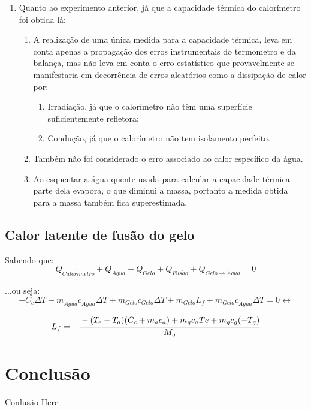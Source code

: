\documentclass[a4paper]{article}
\begin{document}
\begin{enumerate}
\begin{enumerate}
						\item
					\end{enumerate}
					\item Quanto ao experimento anterior, já que a capacidade térmica do calorímetro foi obtida lá:
					\begin{enumerate}
						\item A realização de uma única medida para a capacidade térmica, leva em conta apenas a propagação dos erros instrumentais do termometro e da balança, mas não leva em conta o erro estatístico que provavelmente se manifestaria em decorrência de erros aleatórios como a dissipação de calor por:
						\begin{enumerate}
							\item Irradiação, já que o calorímetro não têm uma superfície suficientemente refletora;
							\item Condução, já que o calorímetro não tem isolamento perfeito.
						\end{enumerate}
						\item Também não foi considerado o erro associado ao calor específico da água.
						\item Ao esquentar a água quente usada para calcular a capacidade térmica parte dela evapora, o que diminui a massa, portanto a medida obtida para a massa também fica superestimada.

					\end{enumerate}
				\end{enumerate}

		\subsection{Calor latente de fusão do gelo}
			Sabendo que:
			\begin{equation}
				Q_{Calor\acute{i}metro} + Q_{\acute{A}gua} + Q_{Gelo} + Q_{Fus\tilde{a}o} + Q_{Gelo \rightarrow \acute{A}gua} = 0
			\end{equation}
			
			...ou seja:
			\hspace{-2cm}%
			$$ - C_{c}\Delta T - m_{\acute{A}gua}c_{\acute{A}gua}\Delta T + m_{Gelo}c_{Gelo}\Delta T +  m_{Gelo}L_{f} + m_{Gelo}c_{\acute{A}gua}\Delta T = 0 \leftrightarrow$$
			
			  $$L_{f} = -\cfrac{- (T_{e}-T_{a})(C_{c}+m_{a}c_{a}) + m_{g}c_{a}T{e} + m_{g}c_{g}(-T_{g})}{M_g}$$
			
	\section{Conclusão}

		Conlusão Here 
\end{document}
